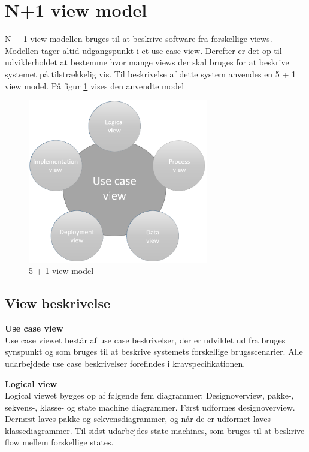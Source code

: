 \section{N+1 view model}

N + 1 view modellen bruges til at beskrive software fra forskellige views. Modellen tager altid udgangspunkt i et use case view. Derefter er det op til udviklerholdet at bestemme hvor mange views der skal bruges for at beskrive systemet på tilstrækkelig vis. Til beskrivelse af dette system anvendes en 5 + 1 view model. På figur \ref{fig:5 + 1 view model} vises den anvendte model


\vspace{-5pt}
\begin{figure}[H]
	\centering
	\includegraphics[width=0.7\textwidth]{Billeder/n+1}
	\vspace{0cm}
	\caption{5 + 1 view model}
	\label{fig:5 + 1 view model}
\end{figure}


\newpage

\subsection{View beskrivelse}

\textbf{Use case view}\\
Use case viewet består af use case beskrivelser, der er udviklet ud fra bruges synspunkt og som bruges til at beskrive systemets forskellige brugsscenarier. Alle udarbejdede use case beskrivelser forefindes i kravspecifikationen.

\textbf{Logical view}\\
Logical viewet bygges op af følgende fem diagrammer: Designoverview, pakke-, sekvens-, klasse- og state machine diagrammer.
Først udformes designoverview. Dernæst laves pakke og sekvensdiagrammer, og når de er udformet laves klassediagrammer. Til sidst udarbejdes state machines, som bruges til at beskrive flow mellem forskellige states.

